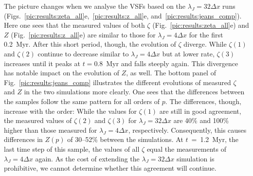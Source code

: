 The picture changes when we analyse the VSFs based on the $\lambda_J = 32\Delta{}x$ runs (Figs.~\ref{pic:results:zeta_all}e,~\ref{pic:results:z_all}e, and~\ref{pic:results:jeans_comp}).
Here one sees that the measured values of both $\zeta$ (Fig.~\ref{pic:results:zeta_all}e) and $Z$ (Fig.~\ref{pic:results:z_all}e) are similar to those for $\lambda_J = 4\Delta{}x$ for the first 0.2~Myr.
After this short period, though, the evolution of $\zeta$ diverge. 
While $\zeta(1)$ and $\zeta(2)$ continue to decrease
   similar to $\lambda_J = 4\Delta{}x$ but at lower rate, 
$\zeta(3)$ increases until it peaks at $t=0.8$~Myr and falls steeply again.
This divergence has notable impact on the evolution of $Z$, as well. 
The bottom panel of Fig.~\ref{pic:results:jeans_comp} illustrates the different evolutions of measured $\zeta$ and $Z$ in the two %
simulations more clearly.
One sees that the differences between the samples follow the same pattern for all orders of $p$.
The differences, though, increase with the order:
While the values for $\zeta(1)$ are still in good agreement, the measured values of $\zeta(2)$ and $\zeta(3)$ for $\lambda_J = 32\Delta{}x$ are 40\% and 100\% higher than those measured for $\lambda_J = 4\Delta{}x$, respectively.
Consequently, this causes differences in $Z(p)$ of 30--52\% between the simulations.
At $t$~=~1.2~Myr, the last time step of this sample, the values of all $\zeta$ equal the measurements of $\lambda_J = 4\Delta{}x$ again.
As 
    the cost of extending the $\lambda_J = 32\Delta{}x$ simulation is prohibitive, we 
    cannot determine whether this agreement will continue.

